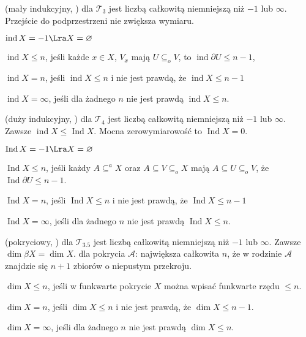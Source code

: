  (mały indukcyjny, ) dla $\mathcal T_3$ jest liczbą całkowitą niemniejszą niż $-1$ lub $\infty$.
Przejście do podprzestrzeni nie zwiększa wymiaru.
\begin{enumx}
\item $\operatorname{ind} X = -1 \Lra X = \varnothing$
\item $\operatorname{ind} X \le n$, jeśli każde $x \in X$, $V_x$ mają $U \subseteq_o V$, to $\operatorname{ind} \partial U \le n-1$,
\item $\operatorname{ind} X = n$, jeśli $\operatorname{ind} X \le n$ i nie jest prawdą, że $\operatorname{ind} X \le n-1$
\item $\operatorname{ind} X = \infty$, jeśli dla żadnego $n$ nie jest prawdą $\operatorname{ind} X \le n$.
\end{enumx}

 (duży indukcyjny, ) dla $\mathcal T_4$ jest liczbą całkowitą niemniejszą niż $-1$ lub $\infty$.
Zawsze $\operatorname{ind}X \le \operatorname{Ind}X$.
Mocna zerowymiarowość to $\operatorname{Ind} X = 0$.
\begin{enumx}
\item $\operatorname{Ind} X = -1 \Lra X = \varnothing$
\item $\operatorname{Ind} X \le n$, jeśli każdy $A \subseteq^a X$ oraz $A \subseteq V \subseteq_o X$ mają $A \subseteq U \subseteq_o V$, że $\operatorname{Ind} \partial U \le n-1$.
\item $\operatorname{Ind} X = n$, jeśli $\operatorname{Ind} X \le n$ i nie jest prawdą, że $\operatorname{Ind} X \le n-1$
\item $\operatorname{Ind} X = \infty$, jeśli dla żadnego $n$ nie jest prawdą $\operatorname{Ind} X \le n$.
\end{enumx}

 (pokryciowy, ) dla $\mathcal T_{3.5}$ jest liczbą całkowitą niemniejszą niż $-1$ lub $\infty$.
Zawsze $\dim \beta X = \dim X$.
 dla pokrycia $\mathcal A$: największa całkowita $n$, że w rodzinie $\mathcal A$ znajdzie się $n+1$ zbiorów o niepustym przekroju.
\begin{enumx}
\item $\dim X \le n$, jeśli w funkwarte pokrycie $X$ można wpisać funkwarte rzędu $\le n$.
\item $\dim X = n$, jeśli $\dim X \le n$ i nie jest prawdą, że $\dim X \le n-1$.
\item $\dim X = \infty$, jeśli dla żadnego $n$ nie jest prawdą $\dim X \le n$.
\end{enumx}

